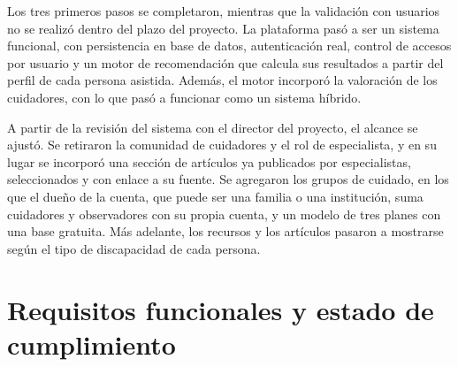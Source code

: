 Los tres primeros pasos se completaron, mientras que la validación con usuarios no se realizó dentro del plazo del proyecto. La plataforma pasó a ser un sistema funcional, con persistencia en base de datos, autenticación real, control de accesos por usuario y un motor de recomendación que calcula sus resultados a partir del perfil de cada persona asistida. Además, el motor incorporó la valoración de los cuidadores, con lo que pasó a funcionar como un sistema híbrido.

A partir de la revisión del sistema con el director del proyecto, el alcance se ajustó. Se retiraron la comunidad de cuidadores y el rol de especialista, y en su lugar se incorporó una sección de artículos ya publicados por especialistas, seleccionados y con enlace a su fuente. Se agregaron los grupos de cuidado, en los que el dueño de la cuenta, que puede ser una familia o una institución, suma cuidadores y observadores con su propia cuenta, y un modelo de tres planes con una base gratuita. Más adelante, los recursos y los artículos pasaron a mostrarse según el tipo de discapacidad de cada persona.

\section{Requisitos funcionales y estado de cumplimiento}

